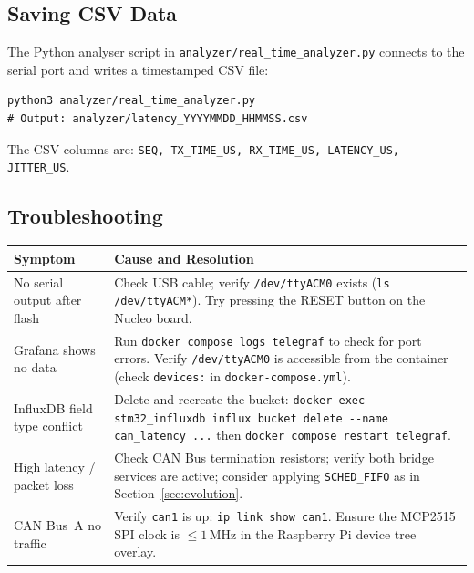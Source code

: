 \documentclass[11pt,a4paper]{article}
\begin{document}
\subsection{Saving CSV Data}

The Python analyser script in \texttt{analyzer/real\_time\_analyzer.py} connects to the
serial port and writes a timestamped CSV file:

\begin{lstlisting}[caption={Save latency data to CSV}]
python3 analyzer/real_time_analyzer.py
# Output: analyzer/latency_YYYYMMDD_HHMMSS.csv
\end{lstlisting}

The CSV columns are: \texttt{SEQ, TX\_TIME\_US, RX\_TIME\_US, LATENCY\_US, JITTER\_US}.

\subsection{Troubleshooting}

\begin{center}
\begin{tabularx}{\textwidth}{|l|X|}
    \hline
    \textbf{Symptom} & \textbf{Cause and Resolution} \\
    \hline
    No serial output after flash &
        Check USB cable; verify \texttt{/dev/ttyACM0} exists (\texttt{ls /dev/ttyACM*}).
        Try pressing the RESET button on the Nucleo board. \\
    \hline
    Grafana shows no data &
        Run \texttt{docker compose logs telegraf} to check for port errors.
        Verify \texttt{/dev/ttyACM0} is accessible from the container (check
        \texttt{devices:} in \texttt{docker-compose.yml}). \\
    \hline
    InfluxDB field type conflict &
        Delete and recreate the bucket:
        \texttt{docker exec stm32\_influxdb influx bucket delete -{-}name can\_latency ...}
        then \texttt{docker compose restart telegraf}. \\
    \hline
    High latency / packet loss &
        Check CAN Bus termination resistors; verify both bridge services are
        active; consider applying \texttt{SCHED\_FIFO} as in Section~\ref{sec:evolution}. \\
    \hline
    CAN Bus~A no traffic &
        Verify \texttt{can1} is up: \texttt{ip link show can1}.  Ensure the
        MCP2515 SPI clock is $\leq 1\,\text{MHz}$ in the Raspberry Pi
        device tree overlay. \\
    \hline
\end{tabularx}
\end{center}
\end{document}
